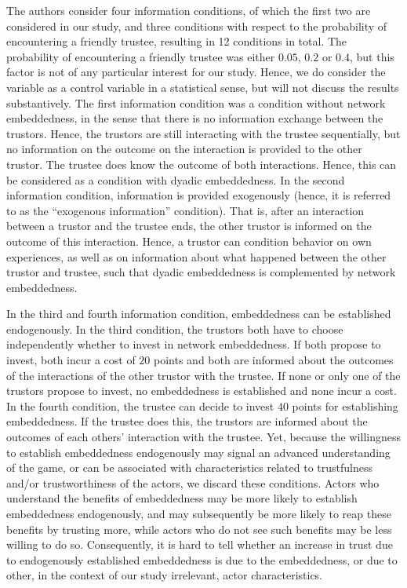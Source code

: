 \documentclass[
  11pt,
]{article}
\begin{document}
The authors consider four information conditions, of which the first two are considered in our study, and three conditions with respect to the probability of encountering a friendly trustee, resulting in 12 conditions in total. The probability of encountering a friendly trustee was either \(0.05\), \(0.2\) or \(0.4\), but this factor is not of any particular interest for our study. Hence, we do consider the variable as a control variable in a statistical sense, but will not discuss the results substantively. The first information condition was a condition without network embeddedness, in the sense that there is no information exchange between the trustors. Hence, the trustors are still interacting with the trustee sequentially, but no information on the outcome on the interaction is provided to the other trustor. The trustee does know the outcome of both interactions. Hence, this can be considered as a condition with dyadic embeddedness. In the second information condition, information is provided exogenously (hence, it is referred to as the ``exogenous information'' condition). That is, after an interaction between a trustor and the trustee ends, the other trustor is informed on the outcome of this interaction. Hence, a trustor can condition behavior on own experiences, as well as on information about what happened between the other trustor and trustee, such that dyadic embeddedness is complemented by network embeddedness.

In the third and fourth information condition, embeddedness can be established endogenously. In the third condition, the trustors both have to choose independently whether to invest in network embeddedness. If both propose to invest, both incur a cost of \(20\) points and both are informed about the outcomes of the interactions of the other trustor with the trustee. If none or only one of the trustors propose to invest, no embeddedness is established and none incur a cost. In the fourth condition, the trustee can decide to invest \(40\) points for establishing embeddedness. If the trustee does this, the trustors are informed about the outcomes of each others' interaction with the trustee. Yet, because the willingness to establish embeddedness endogenously may signal an advanced understanding of the game, or can be associated with characteristics related to trustfulness and/or trustworthiness of the actors, we discard these conditions. Actors who understand the benefits of embeddedness may be more likely to establish embeddedness endogenously, and may subsequently be more likely to reap these benefits by trusting more, while actors who do not see such benefits may be less willing to do so. Consequently, it is hard to tell whether an increase in trust due to endogenously established embeddedness is due to the embeddedness, or due to other, in the context of our study irrelevant, actor characteristics.
\end{document}
